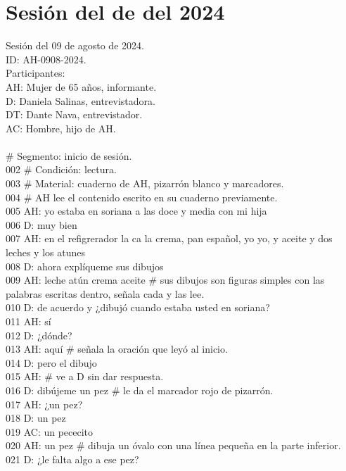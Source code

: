 \section{Sesión del de del 2024}

\noindent
Sesión del 09 de agosto de 2024.\\
ID: AH-0908-2024.\\
Participantes:\\
AH: Mujer de 65 años, informante.\\
D: Daniela Salinas, entrevistadora. \\
DT: Dante Nava, entrevistador.\\
AC: Hombre, hijo de AH.\\
\\
 \# Segmento: inicio de sesión.\\
002 \# Condición: lectura.\\
003 \# Material: cuaderno de AH, pizarrón blanco y marcadores.\\
004 \# AH lee el contenido escrito en su cuaderno previamente.\\
005 AH: yo estaba en soriana a las doce y media con mi hija\\
006 D: muy bien\\
007 AH: en el refigrerador la ca la crema, pan español, yo yo, y aceite y dos leches y los atunes\\
008 D: ahora explíqueme sus dibujos\\
009 AH: leche atún crema aceite \# sus dibujos son figuras simples con las palabras escritas dentro, señala cada y las lee.\\
010 D: de acuerdo y ¿dibujó cuando estaba usted en soriana?\\
011 AH: sí\\
012 D: ¿dónde?\\
013 AH: aquí \# señala la oración que leyó al inicio.\\
014 D: pero el dibujo\\
015 AH: \# ve a D sin dar respuesta.\\
016 D: dibújeme un pez \# le da el marcador rojo de pizarrón.\\
017 AH: ¿un pez?\\
018 D: un pez\\
019 AC: un pececito\\
020 AH: un pez \# dibuja un óvalo con una línea pequeña en la parte inferior.\\
021 D: ¿le falta algo a ese pez?\\
